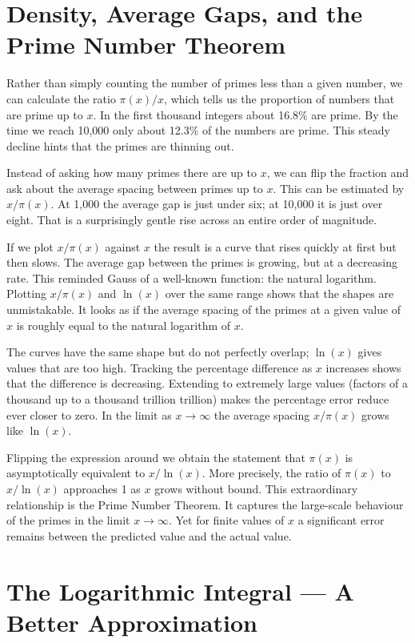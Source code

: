 \documentclass[11pt]{article}
\begin{document}
\section{Density, Average Gaps, and the Prime Number Theorem}

Rather than simply counting the number of primes less than a given number, we can calculate the ratio $\pi(x)/x$, which tells us the proportion of numbers that are prime up to $x$. In the first thousand integers about 16.8\% are prime. By the time we reach 10{,}000 only about 12.3\% of the numbers are prime. This steady decline hints that the primes are thinning out.

Instead of asking how many primes there are up to $x$, we can flip the fraction and ask about the average spacing between primes up to $x$. This can be estimated by $x/\pi(x)$. At 1{,}000 the average gap is just under six; at 10{,}000 it is just over eight. That is a surprisingly gentle rise across an entire order of magnitude.

If we plot $x/\pi(x)$ against $x$ the result is a curve that rises quickly at first but then slows. The average gap between the primes is growing, but at a decreasing rate. This reminded Gauss of a well-known function: the natural logarithm. Plotting $x/\pi(x)$ and $\ln(x)$ over the same range shows that the shapes are unmistakable. It looks as if the average spacing of the primes at a given value of $x$ is roughly equal to the natural logarithm of $x$.

The curves have the same shape but do not perfectly overlap; $\ln(x)$ gives values that are too high. Tracking the percentage difference as $x$ increases shows that the difference is decreasing. Extending to extremely large values (factors of a thousand up to a thousand trillion trillion) makes the percentage error reduce ever closer to zero. In the limit as $x \to \infty$ the average spacing $x/\pi(x)$ grows like $\ln(x)$.

Flipping the expression around we obtain the statement that $\pi(x)$ is asymptotically equivalent to $x/\ln(x)$. More precisely, the ratio of $\pi(x)$ to $x/\ln(x)$ approaches 1 as $x$ grows without bound. This extraordinary relationship is the Prime Number Theorem. It captures the large-scale behaviour of the primes in the limit $x \to \infty$. Yet for finite values of $x$ a significant error remains between the predicted value and the actual value.

\section{The Logarithmic Integral --- A Better Approximation}
\end{document}
